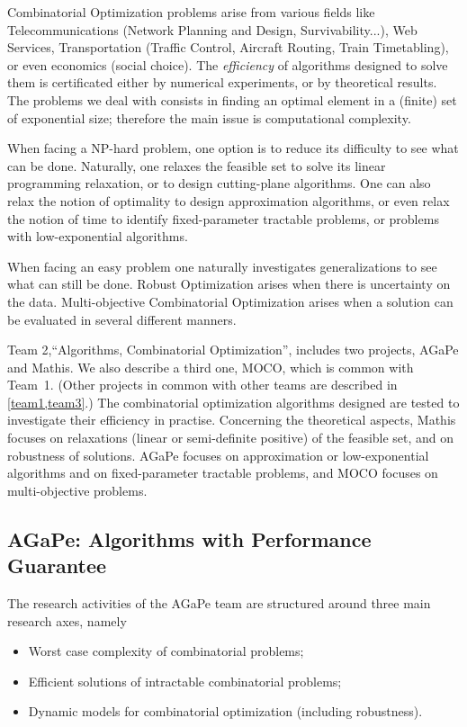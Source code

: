 Combinatorial Optimization problems arise from various fields like Telecommunications (Network Planning and Design, Survivability...), Web Services, Transportation (Traffic Control, Aircraft Routing, Train Timetabling), or even economics (social choice).
The \emph{efficiency} of algorithms designed to solve them is certificated either by numerical experiments, or by theoretical results. The problems we deal with consists in finding an optimal element in a (finite) set of exponential size; therefore the main issue is computational complexity.  

When facing a NP-hard problem, one option is to reduce its difficulty to see what can be done.
Naturally, one relaxes the feasible set to solve its linear programming relaxation, or to design cutting-plane algorithms.
One can also relax the notion of optimality to design approximation algorithms, or even relax the notion of time to identify fixed-parameter tractable problems, or problems with low-exponential algorithms.

When facing an easy problem one naturally investigates generalizations to see what can still be done.
Robust Optimization arises when there is uncertainty on the data.
Multi-objective Combinatorial Optimization arises when a solution can be evaluated in several different manners.

Team 2,``Algorithms, Combinatorial Optimization'', includes two projects, AGaPe and Mathis. We also describe a third one, MOCO, which is common with Team~1. (Other projects in common with other teams are described in \cref{team1,team3}.)
The combinatorial optimization algorithms designed are tested to investigate their efficiency in practise.
Concerning the theoretical aspects, Mathis focuses on relaxations (linear or semi-definite positive) of the feasible set, and on robustness of solutions.
AGaPe focuses on approximation or low-exponential algorithms and on fixed-parameter tractable problems, and
MOCO focuses on multi-objective problems.

\subsection{AGaPe: Algorithms with Performance Guarantee}

The research activities of the AGaPe team are structured around three main research axes, namely
\begin{itemize}
\item Worst case complexity of combinatorial problems;
\item Efficient solutions of intractable combinatorial problems;
\item Dynamic models for combinatorial optimization (including robustness).
\end{itemize}

